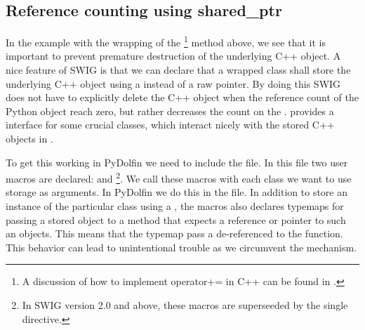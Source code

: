 \subsection{Reference counting using shared\_ptr}
In the example with the wrapping of the \footnote{A discussion of how to implement operator+= in C++ can be found in \cite{Mey97}.} method above, we see that it is important to prevent premature destruction of the underlying C++ object. A nice feature of SWIG is that we can declare that a wrapped class shall store the underlying C++ object using a  instead of a raw pointer. By doing this SWIG does not have to explicitly delete the C++ object when the reference count of the Python object reach zero, but rather decreases the count on the . \dolfin provides a  interface for some crucial classes, which interact nicely with the  stored C++ objects in \dolfin. \par

To get this working in PyDolfin we need to include the  file. In this file two user macros are declared: \-\- and \-\-\footnote{In SWIG version 2.0 and above, these macros are superseeded by the single  directive.}. We call these macros with each class we want to use  storage as arguments. In PyDolfin we do this in the  file. In addition to store an instance of the particular class using a , the macros also declares typemaps for passing a  stored object to a method that expects a reference or pointer to such an objects. This means that the typemap pass a de-referenced  to the function. This behavior can lead to unintentional trouble as we circumvent the  mechanism.\par


